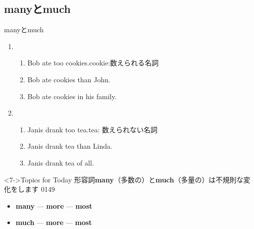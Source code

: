 \documentclass[aspectratio=169,xcolor={dvipsnames,table}]{beamer}
\begin{document}
\subsection{manyとmuch}
\begin{frame}[plain]{manyとmuch}
 \begin{enumerate}
  \item \begin{enumerate}
	 \item<1-> Bob ate too  cookies.\hfill{\scriptsize cookie:数えられる名詞}
	 \item<2-> Bob ate  cookies than John.
	 \item<3-> Bob ate  cookies in his family.\hfill{\scriptsize {}}

	\end{enumerate}
  \item \begin{enumerate}
	 \item<4-> Janis drank too  tea.\hfill{\scriptsize tea: 数えられない名詞}
	 \item<5-> Janis drank  tea than Linda.
	 \item<6-> Janis drank  tea of all.%
\hfill{\scriptsize {}}


	\end{enumerate}
 \end{enumerate}
%
\begin{block}<7->{Topics for Today}\small
形容詞{\bfseries many}（多数の）と{\bfseries much}（多量の）は不規則な変化をします%
\hfill{\tiny 0149}\,{\scriptsize {}}

\begin{itemize}[square]\small
 \item {\bfseries many}  --- {\bfseries more}   --- {\bfseries most}   
 \item {\bfseries much}   --- {\bfseries more}   --- {\bfseries most}   
 \end{itemize}
     \end{block}
\end{frame}
\end{document}
